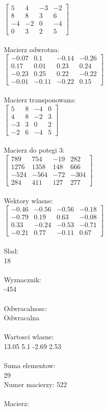 \documentclass[a4paper,12pt]{article}
\begin{document}
$\begin{bmatrix} 5&4&-3&-2\\8&8&3&6\\-4&-2&0&-4\\0&3&2&5 \end{bmatrix}$
\\
\\
Macierz odwrotna:\\

$\begin{bmatrix} -0.07&0.1&-0.14&-0.26\\0.17&0.01&0.23&0.24\\-0.23&0.25&0.22&-0.22\\-0.01&-0.11&-0.22&0.15 \end{bmatrix}$
\\
\\
Macierz transponowana:\\

$\begin{bmatrix} 5&8&-4&0\\4&8&-2&3\\-3&3&0&2\\-2&6&-4&5 \end{bmatrix}$
\\
\\
Macierz do potegi 3:\\

$\begin{bmatrix} 789&754&-19&282\\1276&1358&148&666\\-524&-564&-72&-304\\284&411&127&277 \end{bmatrix}$
\\
\\
Wektory wlasne:\\

$\begin{bmatrix} -0.46&-0.56&-0.56&-0.18\\-0.79&0.19&0.63&-0.08\\0.33&-0.24&-0.53&-0.71\\-0.21&0.77&-0.11&0.67 \end{bmatrix}$
\\
\\
Slad:\\
18
\\
\\
Wyznacznik:\\
-454
\\
\\
Odwracalnosc:\\
Odwracalna
\\
\\
Wartosci wlasne:\\
13.05 5.1 -2.69 2.53
\\
\\
Suma elementow:\\
29
\\
\newpage
Numer macierzy:
522
\\
\\
Macierz:\\
\end{document}
